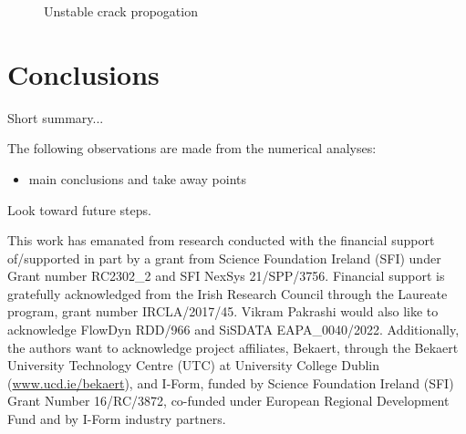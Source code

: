 \documentclass[sn-mathphys,Numbered,draft]{sn-jnl}%
\begin{document}
\begin{figure}[htbp]
	\centering
		
		
		\caption{Unstable crack propogation}
	\label{simulatedDamageNotLimited}
\end{figure}




\section{Conclusions} \label{sec:conclusion}
Short summary...

The following observations are made from the numerical analyses:

\begin{itemize}
\item main conclusions and take away points
\end{itemize}

Look toward future steps.


\backmatter

\noindent This work has emanated from research conducted with the financial support of/supported in part by a grant from Science Foundation Ireland (SFI) under Grant number RC2302\_2 and SFI NexSys 21/SPP/3756. Financial support is gratefully acknowledged from the Irish Research Council through the Laureate program, grant number IRCLA/2017/45. Vikram Pakrashi would also like to acknowledge FlowDyn RDD/966 and SiSDATA EAPA\_0040/2022. Additionally, the authors want to acknowledge project affiliates, Bekaert, through the Bekaert University Technology Centre (UTC) at University College Dublin (\url{www.ucd.ie/bekaert}), and I-Form, funded by Science Foundation Ireland (SFI) Grant Number 16/RC/3872, co-funded under European Regional Development Fund and by I-Form industry partners.
\end{document}
